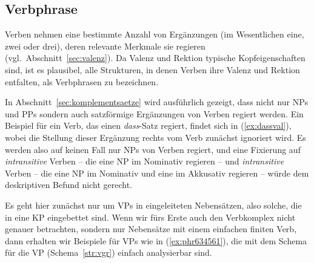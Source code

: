 \subsection{Verbphrase}

\label{sec:verbphrase}


Verben nehmen eine bestimmte Anzahl von Ergänzungen (im Wesentlichen eine, zwei oder drei), deren relevante Merkmale sie regieren (vgl.\ Abschnitt~\ref{sec:valenz}).
Da Valenz und Rektion typische Kopfeigenschaften sind, ist es plausibel, alle Strukturen, in denen Verben ihre Valenz und Rektion entfalten, als Verbphrasen zu bezeichnen.

\begin{exe}
\end{exe}

In Abschnitt~\ref{sec:komplementsaetze} wird ausführlich gezeigt, dass nicht nur NPs und PPs sondern auch satzförmige Ergänzungen von Verben regiert werden.
Ein Beispiel für ein Verb, das einen \textit{dass}-Satz regiert, findet sich in (\ref{ex:dassval}), wobei die Stellung dieser Ergänzung rechts vom Verb zunächst ignoriert wird.
Es werden also auf keinen Fall nur NPs von Verben regiert, und eine Fixierung auf \textit{intransitive} Verben -- die eine NP im Nominativ regieren -- und \textit{intransitive} Verben -- die eine NP im Nominativ und eine im Akkusativ regieren -- würde dem deskriptiven Befund nicht gerecht.

\begin{exe}
\end{exe}

Es geht hier zunächst nur um VPs in eingeleiteten Nebensätzen, also solche, die in eine KP eingebettet sind.
Wenn wir fürs Erste auch den Verbkomplex nicht genauer betrachten, sondern nur Nebensätze mit einem einfachen finiten Verb, dann erhalten wir Beispiele für VPs wie in (\ref{ex:phr634561}), die mit dem Schema für die VP (Schema~\ref{str:vgr}) einfach analysierbar sind.

\begin{exe}
\ex\label{ex:phr634561}\begin{xlist}
\end{xlist} 
\end{exe}

